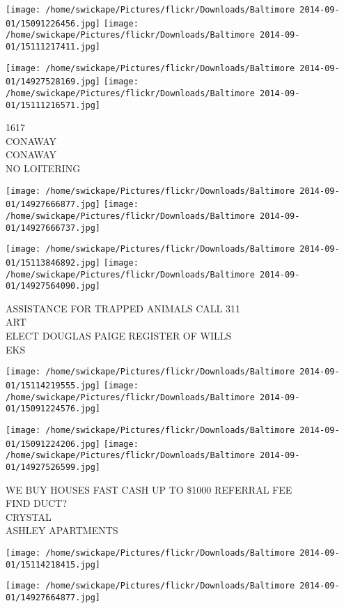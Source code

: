 \documentclass[10pt,letterpaper]{article}
\begin{document}
\texttt{[image: /home/swickape/Pictures/flickr/Downloads/Baltimore 2014-09-01/15091226456.jpg]}
\texttt{[image: /home/swickape/Pictures/flickr/Downloads/Baltimore 2014-09-01/15111217411.jpg]}

\texttt{[image: /home/swickape/Pictures/flickr/Downloads/Baltimore 2014-09-01/14927528169.jpg]}
\texttt{[image: /home/swickape/Pictures/flickr/Downloads/Baltimore 2014-09-01/15111216571.jpg]}

1617\\
CONAWAY\\
CONAWAY\\
NO LOITERING
\pagebreak

\texttt{[image: /home/swickape/Pictures/flickr/Downloads/Baltimore 2014-09-01/14927666877.jpg]}
\texttt{[image: /home/swickape/Pictures/flickr/Downloads/Baltimore 2014-09-01/14927666737.jpg]}

\texttt{[image: /home/swickape/Pictures/flickr/Downloads/Baltimore 2014-09-01/15113846892.jpg]}
\texttt{[image: /home/swickape/Pictures/flickr/Downloads/Baltimore 2014-09-01/14927564090.jpg]}

ASSISTANCE FOR TRAPPED ANIMALS CALL 311\\
ART\\
ELECT DOUGLAS PAIGE REGISTER OF WILLS\\
EKS
\pagebreak

\texttt{[image: /home/swickape/Pictures/flickr/Downloads/Baltimore 2014-09-01/15114219555.jpg]}
\texttt{[image: /home/swickape/Pictures/flickr/Downloads/Baltimore 2014-09-01/15091224576.jpg]}

\texttt{[image: /home/swickape/Pictures/flickr/Downloads/Baltimore 2014-09-01/15091224206.jpg]}
\texttt{[image: /home/swickape/Pictures/flickr/Downloads/Baltimore 2014-09-01/14927526599.jpg]}

WE BUY HOUSES FAST CASH UP TO \$1000 REFERRAL FEE\\
FIND DUCT?\\
CRYSTAL\\
ASHLEY APARTMENTS
\pagebreak

\texttt{[image: /home/swickape/Pictures/flickr/Downloads/Baltimore 2014-09-01/15114218415.jpg]}

\vspace{0.25in}
\texttt{[image: /home/swickape/Pictures/flickr/Downloads/Baltimore 2014-09-01/14927664877.jpg]}
\end{document}
